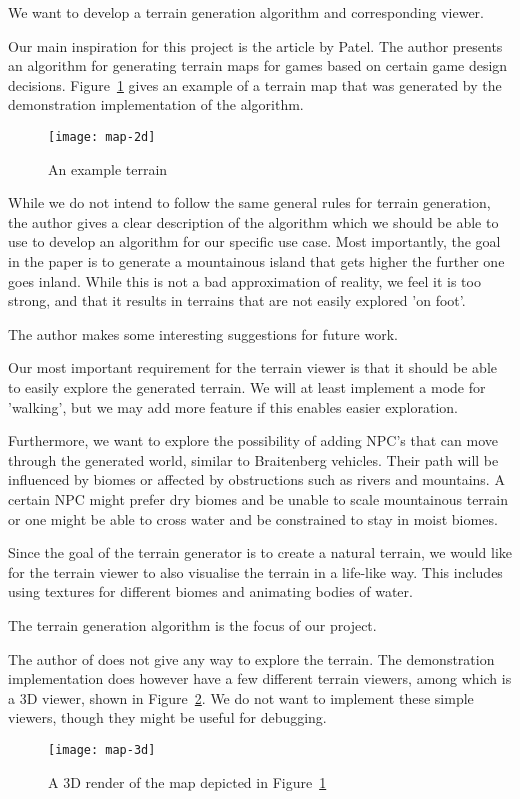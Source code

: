 We want to develop a terrain generation algorithm and corresponding viewer. 

Our main inspiration for this project is the article by Patel\cite{redblob}.
The author presents an algorithm for generating terrain maps for games based on certain game design decisions.
Figure~\ref{fig:map-2d} gives an example of a terrain map that was generated by the demonstration implementation of the algorithm.

\begin{figure}[h]
	\centering
	\texttt{[image: map-2d]}
	\caption{An example terrain}
	\label{fig:map-2d}
\end{figure}

While we do not intend to follow the same general rules for terrain generation, the author gives a clear description of the algorithm which we should be able to use to develop an algorithm for our specific use case.
Most importantly, the goal in the paper is to generate a mountainous island that gets higher the further one goes inland.
While this is not a bad approximation of reality, we feel it is too strong, and that it results in terrains that are not easily explored 'on foot'.

The author makes some interesting suggestions for future work.

Our most important requirement for the terrain viewer is that it should be able to easily explore the generated terrain.
We will at least implement a mode for 'walking', but we may add more feature if this enables easier exploration.

Furthermore, we want to explore the possibility of adding NPC's that can move through the generated world, similar to Braitenberg vehicles.
Their path will be influenced by biomes or affected by obstructions such as rivers and mountains.
A certain NPC might prefer dry biomes and be unable to scale mountainous terrain or one might be able to cross water and be constrained to stay in moist biomes.

Since the goal of the terrain generator is to create a natural terrain, we would like for the terrain viewer to also visualise the terrain in a life-like way.
This includes using textures for different biomes and animating bodies of water.

The terrain generation algorithm is the focus of our project.

The author of \cite{redblob} does not give any way to explore the terrain.
The demonstration implementation does however have a few different terrain viewers, among which is a 3D viewer, shown in Figure~\ref{fig:map-3d}.
We do not want to implement these simple viewers, though they might be useful for debugging.

\begin{figure}[h]
	\centering
	\texttt{[image: map-3d]}
	\caption{A 3D render of the map depicted in Figure~\ref{fig:map-2d}}
	\label{fig:map-3d}
\end{figure}

